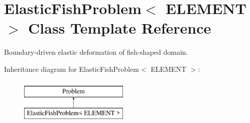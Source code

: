 \hypertarget{classElasticFishProblem}{}\section{Elastic\+Fish\+Problem$<$ E\+L\+E\+M\+E\+NT $>$ Class Template Reference}
\label{classElasticFishProblem}


Boundary-\/driven elastic deformation of fish-\/shaped domain.  


Inheritance diagram for Elastic\+Fish\+Problem$<$ E\+L\+E\+M\+E\+NT $>$\+:\begin{figure}[H]
\begin{center}
\leavevmode
\includegraphics[height=2.000000cm]{classElasticFishProblem}
\end{center}
\end{figure}
